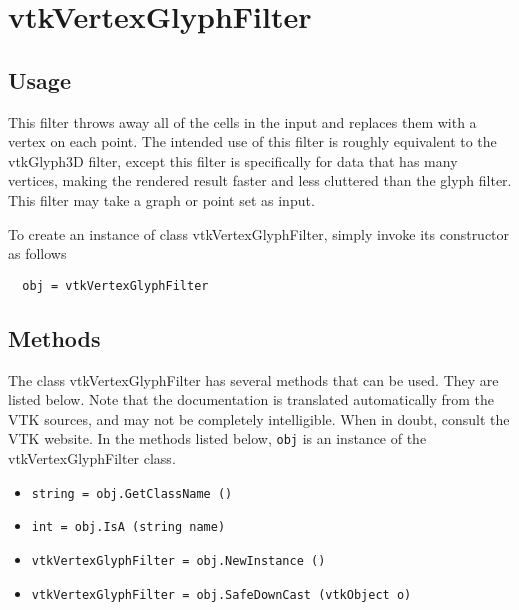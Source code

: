 \section{vtkVertexGlyphFilter}

\subsection{Usage}


 This filter throws away all of the cells in the input and replaces them with
 a vertex on each point.  The intended use of this filter is roughly
 equivalent to the vtkGlyph3D filter, except this filter is specifically for
 data that has many vertices, making the rendered result faster and less
 cluttered than the glyph filter. This filter may take a graph or point set
 as input.


To create an instance of class vtkVertexGlyphFilter, simply
invoke its constructor as follows
\begin{verbatim}
  obj = vtkVertexGlyphFilter
\end{verbatim}
\subsection{Methods}

The class vtkVertexGlyphFilter has several methods that can be used.
  They are listed below.
Note that the documentation is translated automatically from the VTK sources,
and may not be completely intelligible.  When in doubt, consult the VTK website.
In the methods listed below, \verb|obj| is an instance of the vtkVertexGlyphFilter class.
\begin{itemize}
\item  \verb|string = obj.GetClassName ()|

\item  \verb|int = obj.IsA (string name)|

\item  \verb|vtkVertexGlyphFilter = obj.NewInstance ()|

\item  \verb|vtkVertexGlyphFilter = obj.SafeDownCast (vtkObject o)|

\end{itemize}
